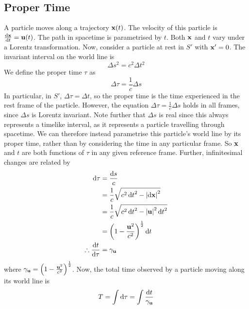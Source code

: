\documentclass{article}
\begin{document}
\subsection{Proper Time}
A particle moves along a trajectory $\vb x(t)$. The velocity of this particle is $\dv{\vb x}{t} = \vb u(t)$. The path in spacetime is parametrised by $t$. Both $\vb x$ and $t$ vary under a Lorentz transformation. Now, consider a particle at rest in $S'$ with $\vb x' = 0$. The invariant interval on the world line is
\[ \Delta s^2 = c^2 \Delta t^2 \]
We define the proper time $\tau$ as
\[ \Delta \tau = \frac{1}{c}\Delta s \]
In particular, in $S'$, $\Delta\tau = \Delta t$, so the proper time is the time experienced in the rest frame of the particle. However, the equation $\Delta \tau = \frac{1}{c}\Delta s$ holds in all frames, since $\Delta s$ is Lorentz invariant. Note further that $\Delta s$ is real since this always represents a timelike interval, as it represents a particle travelling through spacetime. We can therefore instead parametrise this particle's world line by its proper time, rather than by considering the time in any particular frame. So $\vb x$ and $t$ are both functions of $\tau$ in any given reference frame. Further, infinitesimal changes are related by
\begin{align*}
	\dd{\tau} &= \frac{\dd{s}}{c} \\
	&= \frac{1}{c}\sqrt{c^2\dd{t}^2 - \abs{\dd{\vb x}}^2} \\
	&= \frac{1}{c}\sqrt{c^2\dd{t}^2 - \abs{\vb u}^2 \dd{t}^2} \\
	&= \qty(1 - \frac{\vb u^2}{c^2})^{\frac{1}{2}}\dd{t} \\
	\therefore \dv{t}{\tau} &= \gamma_{\vb u}
\end{align*}
where $\gamma_{\vb u} = \qty(1 - \frac{\vb u^2}{c^2})^{\frac{1}{2}}$. Now, the total time observed by a particle moving along its world line is
\[ T = \int \dd{\tau} = \int \frac{\dd{t}}{\gamma_{\vb u}} \]
\end{document}
